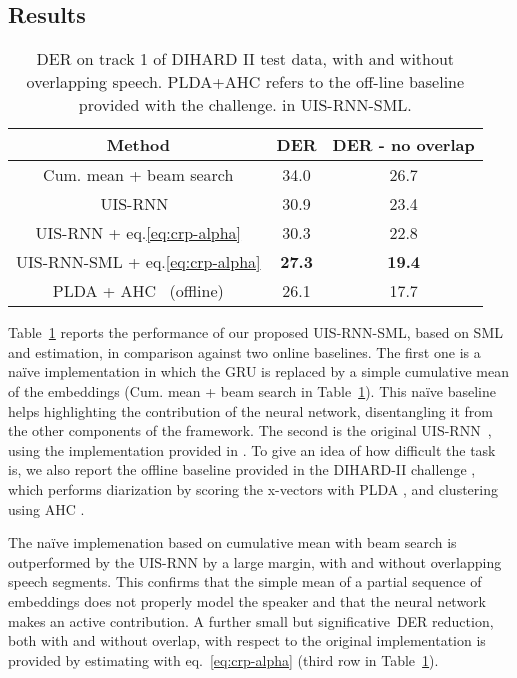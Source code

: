 \documentclass{article}
\begin{document}
\subsection{Results}
\label{sec:results}
\begin{table}[!ht]
\begin{center}
    \begin{tabular}{ |c|c|c| } 
        \hline
        \textbf{Method} & \textbf{DER} & \textbf{DER - no overlap}\\ 
        \hline
        \hline
        Cum. mean + beam search  & 34.0 & 26.7\\
        UIS-RNN~\cite{zhang2019fully}\cite{uisrnn-official-library} & 30.9 & 23.4\\
        UIS-RNN + eq.\ref{eq:crp-alpha} & 30.3 & 22.8\\ 
        UIS-RNN-SML + eq.\ref{eq:crp-alpha} & \textbf{27.3} & \textbf{19.4}\\
        \hline
        \hline
        PLDA + AHC~\cite{Ryant2019} (offline) & 26.1 & 17.7\\
        \hline
    \end{tabular}
\end{center}
\caption{\ac{DER} on track 1 of DIHARD II test data, with and without overlapping speech. \ac{PLDA}+\ac{AHC} refers to the off-line baseline provided with the challenge.  in UIS-RNN-SML.}
\label{tab:DER}
\end{table}

Table~\ref{tab:DER} reports the performance of our proposed UIS-RNN-SML, based on SML and  estimation, in comparison against two online baselines. The first one is a na\"ive implementation in which the GRU is replaced by a simple cumulative mean of the embeddings (Cum. mean + beam search in Table~\ref{tab:DER}). This na\"ive baseline helps highlighting the contribution of the neural network, disentangling it from the other components of the framework. The second is the original UIS-RNN~\cite{zhang2019fully}, using the implementation provided in \cite{uisrnn-official-library}. 
To give an idea of how difficult the task is, we also report the offline baseline provided in the DIHARD-II challenge \cite{Ryant2019}, which performs diarization by scoring the x-vectors with \ac{PLDA} \cite{sell2014speaker}, and clustering using \ac{AHC} \cite{han2008strategies}.

The na\"ive implemenation based on cumulative mean with beam search is outperformed by the UIS-RNN by a large margin, with and without overlapping speech segments. This confirms that the simple mean of a partial sequence of embeddings does not properly model the speaker and that the neural network makes an active contribution. A further small but significative~\ac{DER} reduction, both with and without overlap, with respect to the original implementation is provided by estimating  with eq.~\ref{eq:crp-alpha} (third row in Table~\ref{tab:DER}). 
\end{document}
